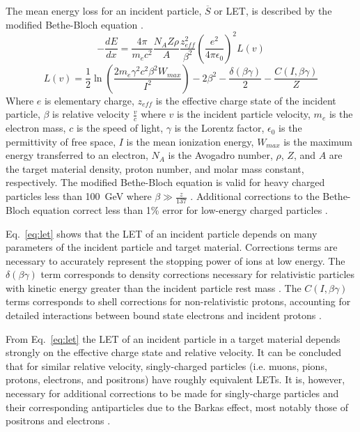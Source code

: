 The mean energy loss for an incident particle, $\overline{S}$ or LET, is described by the modified Bethe-Bloch equation \cite{ziegler2010srim}.
\begin{equation}
    \label{eq:let}
    -\frac{dE}{dx} = \frac{4\pi}{m_e c^2} \frac{N_A Z \rho}{A} 
    \frac{z_{eff}^2}{\beta^2}\left(\frac{e^2}{4 \pi \epsilon_0}\right)^2 L(v)
\end{equation}
\begin{equation}
    \label{eq:bethe-bloch-corr-ion}
    L(v) = \frac{1}{2}\ln\left(\frac{2 m_e \gamma^2 c^2 \beta^2 W_{max}}{I^2}\right) - 2\beta^2 - \frac{\delta(\beta \gamma)}{2} - \frac{C(I,\beta \gamma)}{Z}
\end{equation}
Where $e$ is elementary charge, $z_{eff}$ is the effective charge state of the incident particle, $\beta$ is relative velocity $\frac{v}{c}$ where $v$ is the incident particle velocity, $m_e$ is the electron mass, $c$ is the speed of light, $\gamma$ is the Lorentz factor, $\epsilon_0$ is the permittivity of free space, $I$ is the mean ionization energy, $W_{max}$ is the maximum energy transferred to an electron, $N_A$ is the Avogadro number, $\rho$, $Z$, and $A$ are the target material density, proton number, and molar mass constant, respectively.
The modified Bethe-Bloch equation is valid for heavy charged particles less than 100~GeV where $\beta \gg \frac{z}{137}$ \cite{ziegler2010srim}.
Additional corrections to the Bethe-Bloch equation correct less than 1\% error for low-energy charged particles \cite{ziegler2010srim}.

Eq.~\ref{eq:let} shows that the LET of an incident particle depends on many parameters of the incident particle and target material. 
Corrections terms are necessary to accurately represent the stopping power of ions at low energy.
The $\delta(\beta \gamma)$ term corresponds to density corrections necessary for relativistic particles with kinetic energy greater than the incident particle rest mass \cite{ziegler2010srim}.
The $C(I,\beta \gamma)$ terms corresponds to shell corrections for non-relativistic protons, accounting for detailed interactions between bound state electrons and incident protons \cite{ziegler2010srim}.

From Eq.~\ref{eq:let} the LET of an incident particle in a target material depends strongly on the effective charge state and relative velocity.
It can be concluded that for similar relative velocity, singly-charged particles (i.e. muons, pions, protons, electrons, and positrons) have roughly equivalent LETs.
It is, however, necessary for additional corrections to be made for singly-charge particles and their corresponding antiparticles due to the Barkas effect, most notably those of positrons and electrons \cite{bichsel2010passage}.

